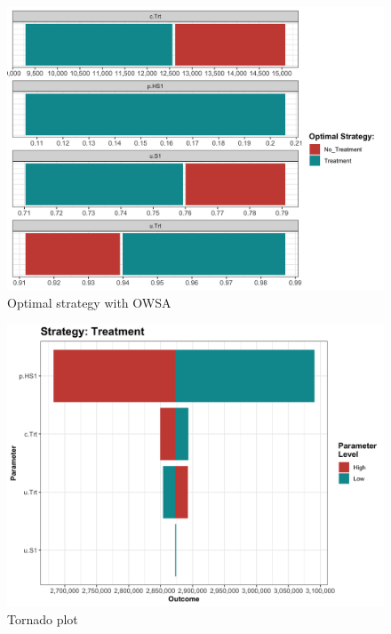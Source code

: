\documentclass[]{article}
\begin{document}
\begin{figure}
\centering
\includegraphics{../figs/05b_optimal-owsa-lrm-nmb.png}
\caption{Optimal strategy with OWSA
\label{fig:05b_optimal-owsa-lrm-nmb}}
\end{figure}

\begin{figure}
\centering
\includegraphics{../figs/05b_tornado-lrm-Treatment-nmb.png}
\caption{Tornado plot \label{fig:05b_tornado-lrm-Treatment-nmb}}
\end{figure}
\end{document}
